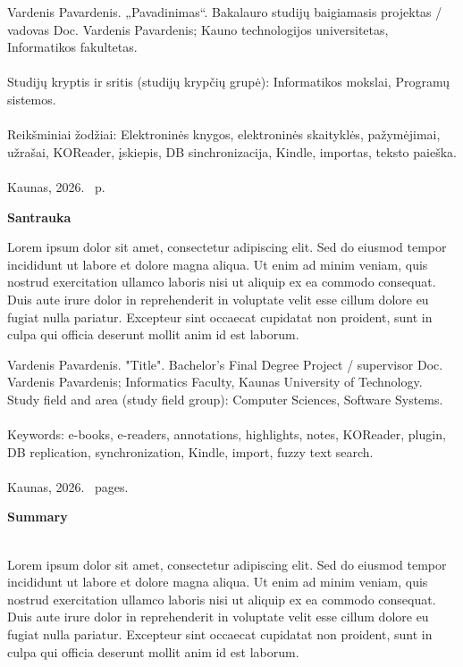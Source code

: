 \thispagestyle{empty}
\newcommand{\autorius}{Vardenis Pavardenis}
\newcommand{\vadovas}{Doc. Vardenis Pavardenis}
\newcommand{\raktZodziai}{Elektroninės knygos, elektroninės skaityklės, pažymėjimai, užrašai, KOReader, įskiepis, DB sinchronizacija, Kindle, importas, teksto paieška}
\newcommand{\keywords}{e-books, e-readers, annotations, highlights, notes, KOReader, plugin, DB replication, synchronization, Kindle, import, fuzzy text search}
\newcommand{\metai}{2026}
\newcommand{\pslKiekis}{\texttt{\pageref{LastPage}}}


Vardenis Pavardenis. „Pavadinimas“. Bakalauro studijų baigiamasis projektas / vadovas \vadovas; Kauno technologijos universitetas, Informatikos fakultetas. \\
\\
Studijų kryptis ir sritis (studijų krypčių grupė): Informatikos mokslai, Programų sistemos. \\
\\
Reikšminiai žodžiai: \raktZodziai. \\
\\
Kaunas, \metai. \pslKiekis\ p. \\

\begin{center}
    \textbf{Santrauka}
\end{center}

Lorem ipsum dolor sit amet, consectetur adipiscing elit. Sed do eiusmod tempor incididunt ut labore et dolore magna aliqua. Ut enim ad minim veniam, quis nostrud exercitation ullamco laboris nisi ut aliquip ex ea commodo consequat. Duis aute irure dolor in reprehenderit in voluptate velit esse cillum dolore eu fugiat nulla pariatur. Excepteur sint occaecat cupidatat non proident, sunt in culpa qui officia deserunt mollit anim id est laborum.
\newpage

Vardenis Pavardenis. "Title". Bachelor's Final Degree Project / supervisor \vadovas; Informatics Faculty, Kaunas University of Technology. \\
Study field and area (study field group): Computer Sciences, Software Systems. \\
\\
Keywords: \keywords. \\
\\
Kaunas, \metai. \pslKiekis\ pages. \\

\begin{center}
    \textbf{Summary}
\end{center}
\\

Lorem ipsum dolor sit amet, consectetur adipiscing elit. Sed do eiusmod tempor incididunt ut labore et dolore magna aliqua. Ut enim ad minim veniam, quis nostrud exercitation ullamco laboris nisi ut aliquip ex ea commodo consequat. Duis aute irure dolor in reprehenderit in voluptate velit esse cillum dolore eu fugiat nulla pariatur. Excepteur sint occaecat cupidatat non proident, sunt in culpa qui officia deserunt mollit anim id est laborum.
\newpage
